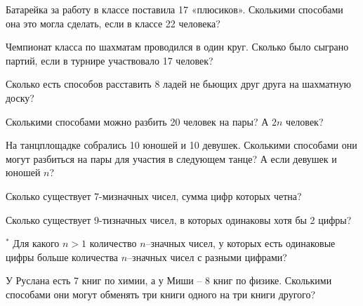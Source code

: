 \begin{thm}
    Батарейка за работу в классе поставила 17 «плюсиков». Сколькими способами она это могла сделать, если в классе 22 человека?
\end{thm}



\begin{thm}
    Чемпионат класса по шахматам проводился в один круг. Сколько было сыграно партий, если в турнире участвовало 17 человек?
\end{thm}

\begin{thm}
    Сколько есть способов расставить 8 ладей не бьющих друг друга на шахматную доску?
\end{thm}

\begin{thm}
    Сколькими способами можно разбить 20 человек на пары? А $2n$ человек?
\end{thm}

\begin{thm}
    На танцплощадке собрались 10 юношей и 10 девушек. Сколькими способами они могут разбиться на пары для участия в следующем танце? А если девушек и юношей $n$?
\end{thm}

\begin{thm}
    Сколько существует 7-мизначных чисел, сумма цифр которых четна?
\end{thm}

\begin{thm}
    Сколько существует 9-тизначных чисел, в которых одинаковы хотя бы 2 цифры?
\end{thm}

\begin{thm} $^*$
    Для какого $n > 1$ количество $n$--значных чисел, у которых есть одинаковые цифры больше количества $n$--значных чисел с разными цифрами?
\end{thm}


\begin{ex}
    У Руслана есть 7 книг по химии, а у Миши – 8 книг по физике. Сколькими способами они могут обменять три книги одного на три книги другого?
\end{ex}

